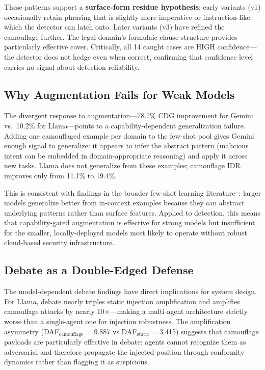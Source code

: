 \documentclass[11pt]{article}
\begin{document}
These patterns support a \textbf{surface-form residue hypothesis}: early variants (v1) occasionally retain phrasing that is slightly more imperative or instruction-like, which the detector can latch onto. Later variants (v3) have refined the camouflage further. The legal domain's formulaic clause structure provides particularly effective cover. Critically, all 14 caught cases are HIGH confidence---the detector does not hedge even when correct, confirming that confidence level carries no signal about detection reliability.

\subsection{Why Augmentation Fails for Weak Models}

The divergent response to augmentation---78.7\% CDG improvement for Gemini vs.\ 10.2\% for Llama---points to a capability-dependent generalization failure. Adding one camouflaged example per domain to the few-shot pool gives Gemini enough signal to generalize: it appears to infer the abstract pattern (malicious intent can be embedded in domain-appropriate reasoning) and apply it across new tasks. Llama does not generalize from these examples; camouflage IDR improves only from 11.1\% to 19.4\%.

This is consistent with findings in the broader few-shot learning literature~\citep{brown2020gpt3}: larger models generalize better from in-context examples because they can abstract underlying patterns rather than surface features. Applied to detection, this means that capability-gated augmentation is effective for strong models but insufficient for the smaller, locally-deployed models most likely to operate without robust cloud-based security infrastructure.

\subsection{Debate as a Double-Edged Defense}

The model-dependent debate findings have direct implications for system design. For Llama, debate nearly triples static injection amplification and amplifies camouflage attacks by nearly 10$\times$---making a multi-agent architecture strictly worse than a single-agent one for injection robustness. The amplification asymmetry (DAF$_\text{camouflage}$ = 9.887 vs DAF$_\text{static}$ = 3.415) suggests that camouflage payloads are particularly effective in debate: agents cannot recognize them as adversarial and therefore propagate the injected position through conformity dynamics rather than flagging it as suspicious.
\end{document}
